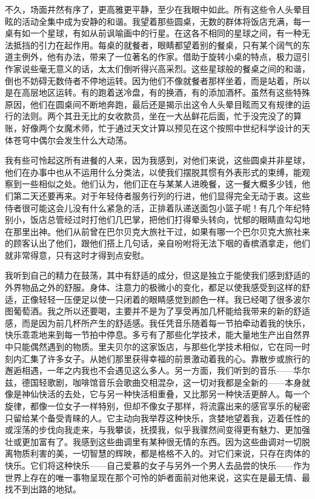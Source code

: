 \par 不久，场面井然有序了，更高雅更平静，至少在我眼中如此。所有这些令人头晕目眩的活动全集中成为安静的和谐。我望着那些圆桌，无数的群体将饭店充满，每一桌有如一个星球，有如从前讽喻画中的行星。在这各不相同的星球之间，有一种无法抵挡的引力在起作用。每桌的就餐者，眼睛都望着别的餐桌，只有某个阔气的东道主例外，他有办法，带来了一位著名的作家。借助于旋转小桌的特点，极力逗引作家说些毫无意义的话，太太们倒听得兴高采烈。这些星球般的餐桌之间的和谐，倒也不妨碍无数侍者不停地运转。因为他们不像就餐者那样坐着，而是站着，所以是在高层地区运转。有的跑着送冷盘，有的换酒，有的添加酒杯。虽然有这些特殊原因，他们在圆桌间不断地奔跑，最后还是揭示出这令人头晕目眩而又有规律的运行的法则。两个其丑无比的女收款员，坐在一大丛鲜花后面，忙于没完没了的算账，好像两个女魔术师，忙于通过天文计算以预见在这个按照中世纪科学设计的天体苍穹中偶尔会发生什么大动荡。
\par 我有些可怜起这所有进餐的人来，因为我感到，对他们来说，这些圆桌并非星球，他们在办事中也从不运用什么分类法，以使我们摆脱其惯有外表形式的束缚，能观察到一些相似之处。他们认为，他们正在与某某人进晚餐，这一餐大概多少钱，他们第二天还要再来。对于年轻侍者服务行列的行进，他们显得完全无动于衷。这些侍者很可能这会儿没有什么紧急的活，正排着队递送面包小篮子呢！有几个年纪特别小，饭店总管经过时打他们几巴掌，把他们打得晕头转向，忧郁的眼睛直勾勾地在那里出神。他们从前曾在巴尔贝克大旅社干过，如果有哪一个巴尔贝克大旅社来的顾客认出了他们，跟他们搭上几句话，亲自吩咐将无法下咽的香槟酒拿走，他们就非常得意，只有这时才得到点安慰。
\par 我听到自己的精力在鼓荡，其中有舒适的成分，但这是独立于能使我们感到舒适的外界物品之外的舒服。身体、注意力的极微小的变化，都足以使我感受到这样的舒适，正像轻轻一压便足以使一只闭着的眼睛感觉到颜色一样。我已经喝了很多波尔图葡萄酒。我之所以还要喝，主要并不是为了享受再加几杯能给我带来的新的舒适感，而是因为前几杯所产生的舒适感。我任凭音乐随着每一节拍牵动着我的快乐，快乐乖乖地来到每一节拍中停息。多亏有了那些化学技术，能大量地生产出自然界中只能偶然遇到的物质。里夫贝尔的这家饭店，与那些化学技术相似，它在同一时刻内汇集了许多女子。从她们那里获得幸福的前景激动着我的心。靠散步或旅行的邂逅相遇，一年之内我也不会遇见这么多人。另一方面，我们听到的音乐——华尔兹，德国轻歌剧，咖啡馆音乐会歌曲交相混杂，这一切对我都是全新的——本身就像是神仙快活的去处，它与另一种快活相重叠，又比那另一种快活更醉人。每一个旋律，都像一位女子一样特别，但却不像女子那样，将流露出来的感官享乐的秘密只留给某个备受青睐的人。它主动向我举荐这种快乐，贪婪地望着我，迈着任性的或淫荡的步伐向我走来，与我攀谈，抚摸我，似乎我骤然间变得更有魅力、更加强壮或更加富有了。我感到这些曲调里有某种很无情的东西。因为这些曲调对一切脱离物质利害的美，一切智慧的辉映，都是格格不入的。对它们来说，只存在肉体的快乐。它们将这种快乐——自己爱慕的女子与另外一个男人去品尝的快乐——作为世界上存在的唯一事物呈现在那个可怜的妒者面前对他来说，这实在是最无情、最找不到出路的地狱。
